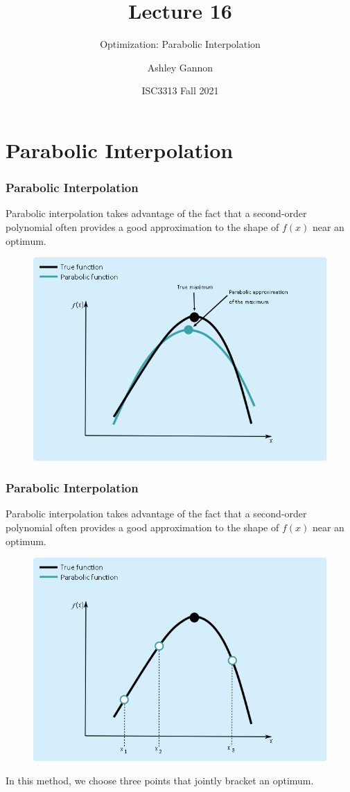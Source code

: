 \documentclass{if-beamer}
\title[Lecture 16]{Lecture 16}
\subtitle{Optimization: Parabolic Interpolation}
\author{Ashley Gannon}
\date{ISC3313 Fall 2021}
\begin{document}
\begin{frame}
  \titlepage
\end{frame}
\section{Parabolic Interpolation}

\begin{frame}
	\frametitle{Parabolic Interpolation}
	Parabolic interpolation takes advantage of the fact that a second-order polynomial often
	provides a good approximation to the shape of $f(x)$ near an optimum.
	\begin{figure}
		\centering
		\includegraphics[width = .5\textwidth]{figures/para1}
	\end{figure} 
\end{frame}

\begin{frame}
	\frametitle{Parabolic Interpolation}
	Parabolic interpolation takes advantage of the fact that a second-order polynomial often
	provides a good approximation to the shape of $f(x)$ near an optimum.
	\begin{figure}
		\centering
		\includegraphics[width = .5\textwidth]{figures/para2}
	\end{figure} 
	In this method, we choose three points that jointly bracket an optimum. 
\end{frame}
\end{document}
